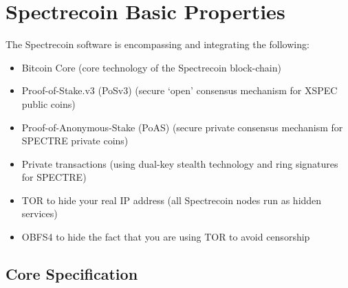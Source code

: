 \chapter{Spectrecoin Basic Properties}
The Spectrecoin software is encompassing and integrating the following: 

\begin{itemize}
	\item Bitcoin Core (core technology of the Spectrecoin block-chain) 
	\item Proof-of-Stake.v3 (PoSv3) (secure ‘open’ consensus mechanism for XSPEC public coins)
	\item Proof-of-Anonymous-Stake (PoAS) (secure private consensus mechanism for SPECTRE private coins)
	\item Private transactions (using dual-key stealth technology and ring signatures for SPECTRE) 
	\item TOR to hide your real IP address (all Spectrecoin nodes run as hidden services) 
	\item OBFS4 to hide the fact that you are using TOR to avoid censorship	
\end{itemize}



\section{Core Specification}

